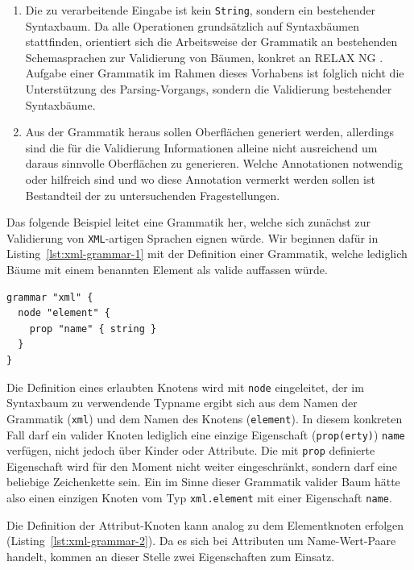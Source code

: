 \documentclass[paper=a4,fontsize=12pt,parskip=half]{scrartcl}
\begin{document}
\begin{enumerate}
\item Die zu verarbeitende Eingabe ist kein \texttt{String}, sondern ein bestehender Syntaxbaum. Da alle Operationen grundsätzlich auf Syntaxbäumen stattfinden, orientiert sich die Arbeitsweise der Grammatik an bestehenden Schemasprachen zur Validierung von Bäumen, konkret an RELAX NG \cite{clark_relax_2001}. Aufgabe einer Grammatik im Rahmen dieses Vorhabens ist folglich nicht die Unterstützung des Parsing-Vorgangs, sondern die Validierung bestehender Syntaxbäume.
\item Aus der Grammatik heraus sollen Oberflächen generiert werden, allerdings sind die für die Validierung Informationen alleine nicht ausreichend um daraus sinnvolle Oberflächen zu generieren. Welche Annotationen notwendig oder hilfreich sind und wo diese Annotation vermerkt werden sollen ist Bestandteil der zu untersuchenden Fragestellungen.
\end{enumerate}

Das folgende Beispiel leitet eine Grammatik her, welche sich zunächst zur Validierung von \texttt{XML}-artigen Sprachen eignen würde. Wir beginnen dafür in Listing~\ref{lst:xml-grammar-1} mit der Definition einer Grammatik, welche lediglich Bäume mit einem benannten Element als valide auffassen würde.

\begin{lstlisting}[float=h, label={lst:xml-grammar-1},caption={\texttt{XML} Schritt 1 - Elemente mit Namen},captionpos=b,language={Grammar}]
grammar "xml" {
  node "element" {
    prop "name" { string }
  }
}
\end{lstlisting}

Die Definition eines erlaubten Knotens wird mit \texttt{node} eingeleitet, der im Syntaxbaum zu verwendende Typname ergibt sich aus dem Namen der Grammatik (\texttt{xml}) und dem Namen des Knotens (\texttt{element}). In diesem konkreten Fall darf ein valider Knoten lediglich eine einzige Eigenschaft (\texttt{prop(erty)}) \texttt{name} verfügen, nicht jedoch über Kinder oder Attribute. Die mit \texttt{prop} definierte Eigenschaft wird für den Moment nicht weiter eingeschränkt, sondern darf eine beliebige Zeichenkette sein. Ein im Sinne dieser Grammatik valider Baum hätte also einen einzigen Knoten vom Typ \texttt{xml.element} mit einer Eigenschaft \texttt{name}.

Die Definition der Attribut-Knoten kann analog zu dem Elementknoten erfolgen (Listing~\ref{lst:xml-grammar-2}). Da es sich bei Attributen um Name-Wert-Paare handelt, kommen an dieser Stelle zwei Eigenschaften zum Einsatz.
\end{document}
